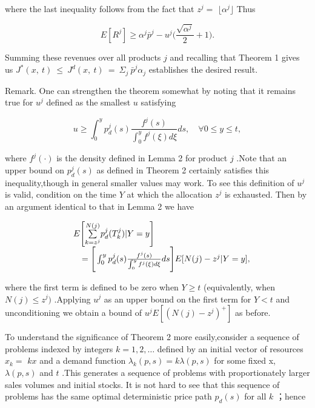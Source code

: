 where the last inequality follows from the fact that \(z ^ { j } =\)
\(\lfloor \alpha ^ { j } \rfloor\) Thus

\[
E [ R ^ { j } ] \geqslant \alpha ^ { j } \bar { p } ^ { j } - u ^ { j } \biggl ( \frac { \sqrt { \alpha ^ { j } } } { 2 } + 1 \biggr ) .
\]

Summing these revenues over all products \(j\) and recalling that
Theorem 1 gives us
\(J ^ { * } ( x , \ t ) \ \leqslant \ J ^ { d } ( x , \ t ) \ = \ \Sigma _ { j } \ \bar { p } ^ { j } \alpha _ { j }\)
establishes the desired result.

Remark. One can strengthen the theorem somewhat by noting that it
remains true for \(u ^ { j }\) defined as the smallest \(u\) satisfying

\[
u \geqslant \int _ { 0 } ^ { y } p _ { d } ^ { j } ( s ) \frac { f ^ { j } ( s ) } { \int _ { 0 } ^ { y } f ^ { j } ( \xi ) d \xi } d s , \quad \forall 0 \leqslant y \leqslant t ,
\]

where \(f ^ { j } ( \cdot )\) is the density defined in Lemma 2 for
product \(j\) .Note that an upper bound on \(p _ { d } ^ { j } ( s )\)
as defined in Theorem 2 certainly satisfies this inequality,though in
general smaller values may work. To see this definition of \(u ^ { j }\)
is valid, condition on the time \(Y\) at which the allocation
\(z ^ { j }\) is exhausted. Then by an argument identical to that in
Lemma 2 we have

\[
\begin{array} { r l } & { E \Bigg [ \underset { k = z ^ { j } } { \overset { N ( j ) } { \sum } } p _ { d } ^ { j } ( T _ { k } ^ { j } ) | Y = y \Bigg ] } \\ & { \quad = \Bigg [ \int _ { 0 } ^ { y } p _ { d } ^ { j } ( s ) \frac { f ^ { j } ( s ) } { \int _ { 0 } ^ { y } f ^ { j } ( \xi ) d \xi } d s \Bigg ] E [ N ( j ) - z ^ { j } | Y = y ] , } \end{array}
\]

where the first term is defined to be zero when \(Y \geqslant t\)
(equivalently, when \(N ( j ) \leqslant z ^ { j } )\) .Applying
\(u ^ { j }\) as an upper bound on the first term for \(Y < t\) and
unconditioning we obtain a bound of
\(u ^ { j } E [ ( N ( j ) - z ^ { j } ) ^ { + } ]\) as before.

To understand the significance of Theorem 2 more easily,consider a
sequence of problems indexed by integers \(k = 1 , 2 , \dots\) defined
by an initial vector of resources \(x _ { k } =\) \(k x\) and a demand
function \(\lambda _ { k } ( p , s ) = k \lambda ( p , s )\) for some
fixed x, \(\lambda ( p , s )\) and \(t\) .This generates a sequence of
problems with proportionately larger sales volumes and initial stocks.
It is not hard to see that this sequence of problems has the same
optimal deterministic price path \(p _ { d } ( s )\) for all \(k\)
；hence

